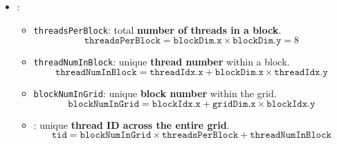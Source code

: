\begin{itemize}
    \item {}:
    \begin{itemize}
        \item \texttt{threadsPerBlock}: total \textbf{number of threads in a block}.
        \begin{equation*}
            \texttt{threadsPerBlock} = \texttt{blockDim.x} \times \texttt{blockDim.y} = 8
        \end{equation*}

        \item \texttt{threadNumInBlock}: unique \textbf{thread number} within a block.
        \begin{equation*}
            \texttt{threadNumInBlock} = \texttt{threadIdx.x} + \texttt{blockDim.x} \times \texttt{threadIdx.y}
        \end{equation*}

        \item \texttt{blockNumInGrid}: unique \textbf{block number} within the grid.
        \begin{equation*}
            \texttt{blockNumInGrid} = \texttt{blockIdx.x} + \texttt{gridDim.x} \times \texttt{blockIdx.y}
        \end{equation*}

        \item {}: unique \textbf{thread ID across the entire grid}.
        \begin{equation*}
            \texttt{tid} = \texttt{blockNumInGrid} \times \texttt{threadsPerBlock} + \texttt{threadNumInBlock}
        \end{equation*}
    \end{itemize}
\end{itemize}
